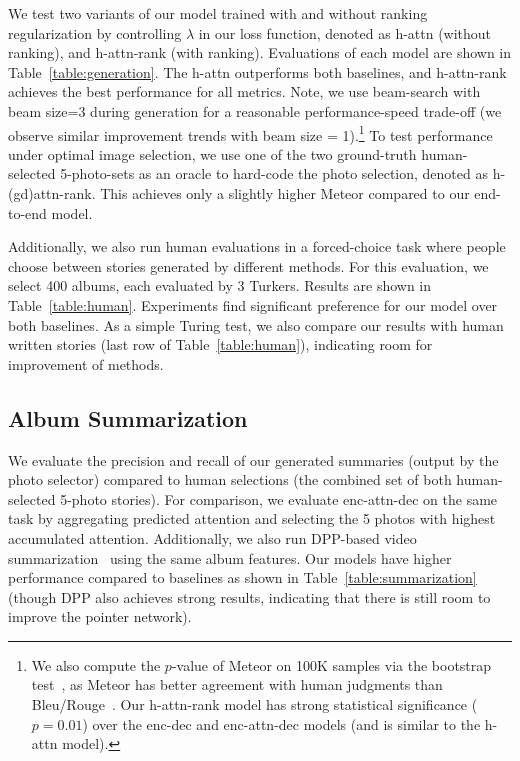 We test two variants of our model trained with and without ranking regularization by controlling $\lambda$ in our loss function, denoted as h-attn (without ranking), and h-attn-rank (with ranking).
Evaluations of each model are shown in Table~\ref{table:generation}.
The h-attn outperforms both baselines, and h-attn-rank achieves the best performance for all metrics.
Note, we use beam-search with beam size=3 during generation for a reasonable performance-speed trade-off (we observe similar improvement trends with beam size = 1).\footnote{We also compute the $p$-value of Meteor on 100K samples via the bootstrap test~\cite{efron1994introduction}, as Meteor has better agreement with human judgments than Bleu/Rouge~\cite{huang2016visual}.
Our h-attn-rank model has strong statistical significance ($p=0.01$) over the enc-dec and enc-attn-dec models (and is similar to the h-attn model).}
To test performance under optimal image selection, we use one of the two ground-truth human-selected 5-photo-sets as an oracle to hard-code the photo selection, denoted as h-(gd)attn-rank.
This achieves only a slightly higher Meteor compared to our end-to-end model.

Additionally, we also run human evaluations in a forced-choice task where people choose between stories generated by different methods.
For this evaluation, we select 400 albums, each evaluated by 3 Turkers. Results are shown in Table~\ref{table:human}. 
Experiments find significant preference for our model over both baselines. As a simple Turing test, we also compare our results with human written stories (last row of Table~\ref{table:human}), indicating room for improvement of methods.


\subsection{Album Summarization}
We evaluate the precision and recall of our generated summaries (output by the photo selector) compared to human selections (the combined set of both human-selected 5-photo stories). 
For comparison, we evaluate enc-attn-dec on the same task by aggregating predicted attention and selecting the 5 photos with highest accumulated attention.
Additionally, we also run DPP-based video summarization~\cite{kulesza2012determinantal} using the same album features.
Our models have higher performance compared to baselines as shown in Table~\ref{table:summarization} (though DPP also achieves strong results, indicating that there is still room to improve the pointer network).

